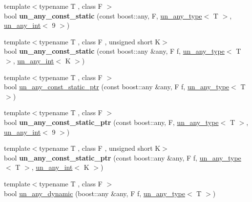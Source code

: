 \begin{DoxyCompactItemize}
{\footnotesize template$<$typename T , class F $>$ }\\bool {\bfseries un\+\_\+any\+\_\+const\+\_\+static} (const boost\+::any, F, \mbox{\hyperlink{struct_s_m_spp__di__unipi__it_1_1un__any__type}{un\+\_\+any\+\_\+type}}$<$ T $>$, \mbox{\hyperlink{struct_s_m_spp__di__unipi__it_1_1un__any__int}{un\+\_\+any\+\_\+int}}$<$ 9 $>$)
\item 
\mbox{\label{group__boost__any__stuff_gaf6306add6c5b643a1087508e8101f972}} 
{\footnotesize template$<$typename T , class F , unsigned short K$>$ }\\bool {\bfseries un\+\_\+any\+\_\+const\+\_\+static} (const boost\+::any \&any, F f, \mbox{\hyperlink{struct_s_m_spp__di__unipi__it_1_1un__any__type}{un\+\_\+any\+\_\+type}}$<$ T $>$, \mbox{\hyperlink{struct_s_m_spp__di__unipi__it_1_1un__any__int}{un\+\_\+any\+\_\+int}}$<$ K $>$)
\item 
{\footnotesize template$<$typename T , class F $>$ }\\bool \mbox{\hyperlink{group__boost__any__stuff_ga46275e01a585a3a4bfcc243a595aa7dd}{un\+\_\+any\+\_\+const\+\_\+static\+\_\+ptr}} (const boost\+::any \&any, F f, \mbox{\hyperlink{struct_s_m_spp__di__unipi__it_1_1un__any__type}{un\+\_\+any\+\_\+type}}$<$ T $>$)
\item 
\mbox{\label{group__boost__any__stuff_gad064fb85ac8749fb8a6ca126ab85d1f3}} 
{\footnotesize template$<$typename T , class F $>$ }\\bool {\bfseries un\+\_\+any\+\_\+const\+\_\+static\+\_\+ptr} (const boost\+::any, F, \mbox{\hyperlink{struct_s_m_spp__di__unipi__it_1_1un__any__type}{un\+\_\+any\+\_\+type}}$<$ T $>$, \mbox{\hyperlink{struct_s_m_spp__di__unipi__it_1_1un__any__int}{un\+\_\+any\+\_\+int}}$<$ 9 $>$)
\item 
\mbox{\label{group__boost__any__stuff_ga7c2abd7ebd93be543ad861555c0a5cf6}} 
{\footnotesize template$<$typename T , class F , unsigned short K$>$ }\\bool {\bfseries un\+\_\+any\+\_\+const\+\_\+static\+\_\+ptr} (const boost\+::any \&any, F f, \mbox{\hyperlink{struct_s_m_spp__di__unipi__it_1_1un__any__type}{un\+\_\+any\+\_\+type}}$<$ T $>$, \mbox{\hyperlink{struct_s_m_spp__di__unipi__it_1_1un__any__int}{un\+\_\+any\+\_\+int}}$<$ K $>$)
\item 
{\footnotesize template$<$typename T , class F $>$ }\\bool \mbox{\hyperlink{group__boost__any__stuff_gaf12786a4337938023337a397d0077949}{un\+\_\+any\+\_\+dynamic}} (boost\+::any \&any, F f, \mbox{\hyperlink{struct_s_m_spp__di__unipi__it_1_1un__any__type}{un\+\_\+any\+\_\+type}}$<$ T $>$)

\end{DoxyCompactItemize}

